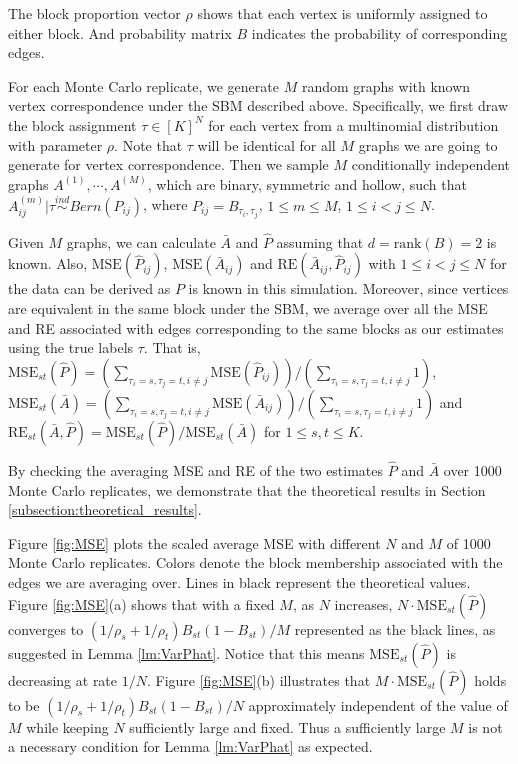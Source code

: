 The block proportion vector $\rho$ shows that each vertex is uniformly assigned to either block. And probability matrix $B$ indicates the probability of corresponding edges.

For each Monte Carlo replicate, we generate $M$ random graphs with known vertex correspondence under the SBM described above. Specifically, we first draw the block assignment $\tau \in [K]^N$ for each vertex from a multinomial distribution with parameter $\rho$. Note that $\tau$ will be identical for all $M$ graphs we are going to generate for vertex correspondence. Then we sample $M$ conditionally independent graphs $A^{(1)}, \cdots, A^{(M)}$, which are binary, symmetric and hollow, such that $A^{(m)}_{ij}|\tau \stackrel{ind}{\sim} Bern(P_{ij})$, where $P_{ij} = B_{\tau_i, \tau_j}$, $1 \le m \le M$, $1 \le i < j \le N$.

Given $M$ graphs, we can calculate $\bar{A}$ and $\hat{P}$ assuming that $d = \mathrm{rank}(B) = 2$ is known. Also, $\mathrm{MSE}(\hat{P}_{ij})$, $\mathrm{MSE}(\bar{A}_{ij})$ and $\mathrm{RE}(\bar{A}_{ij}, \hat{P}_{ij})$ with $1 \le i < j \le N$ for the data can be derived as $P$ is known in this simulation. Moreover, since vertices are equivalent in the same block under the SBM, we average over all the MSE and RE associated with edges corresponding to the same blocks as our estimates using the true labels $\tau$. That is, $\mathrm{MSE}_{st}(\hat{P}) = (\sum_{\tau_i = s, \tau_j = t, i\ne j} \mathrm{MSE}(\hat{P}_{ij}))/(\sum_{\tau_i = s, \tau_j = t, i\ne j}1)$, $\mathrm{MSE}_{st}(\bar{A}) = (\sum_{\tau_i = s, \tau_j = t, i\ne j} \mathrm{MSE}(\bar{A}_{ij}))/(\sum_{\tau_i = s, \tau_j = t, i\ne j}1)$ and $\mathrm{RE}_{st}(\bar{A}, \hat{P}) = \mathrm{MSE}_{st}(\hat{P})/\mathrm{MSE}_{st}(\bar{A})$ for $1 \le s, t \le K$.

By checking the averaging MSE and RE of the two estimates $\hat{P}$ and $\bar{A}$ over 1000 Monte Carlo replicates, we demonstrate that the theoretical results in Section \ref{subsection:theoretical_results}.

Figure \ref{fig:MSE} plots the scaled average MSE with different $N$ and $M$ of 1000 Monte Carlo replicates. Colors denote the block membership associated with the edges we are averaging over. Lines in black represent the theoretical values.
Figure \ref{fig:MSE}(a) shows that with a fixed $M$, as $N$ increases, $N \cdot \mathrm{MSE}_{st}(\hat{P})$ converges to $(1/\rho_s + 1/\rho_t) B_{st}(1-B_{st}) / M$ represented as the black lines, as suggested in Lemma \ref{lm:VarPhat}. Notice that this means $\mathrm{MSE}_{st}(\hat{P})$ is decreasing at rate $1/N$.
Figure \ref{fig:MSE}(b) illustrates that $M \cdot \mathrm{MSE}_{st}(\hat{P})$ holds to be $(1/\rho_s + 1/\rho_t) B_{st}(1-B_{st}) / N$ approximately independent of the value of $M$ while keeping $N$ sufficiently large and fixed. Thus a sufficiently large $M$ is not a necessary condition for Lemma \ref{lm:VarPhat} as expected.


